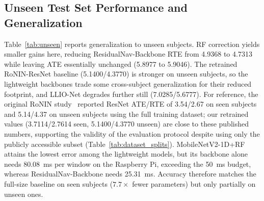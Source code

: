 \documentclass[10pt,conference,letterpaper]{IEEEtran}
\begin{document}
\subsection{Unseen Test Set Performance and Generalization}


Table~\ref{tab:unseen} reports generalization to unseen subjects. RF correction yields smaller gains here, reducing ResidualNav-Backbone RTE from 4.9368 to 4.7313 while leaving ATE essentially unchanged (5.8977 to 5.9046). The retrained RoNIN-ResNet baseline (5.1400/4.3770) is stronger on unseen subjects, so the lightweight backbones trade some cross-subject generalization for their reduced footprint, and LLIO-Net degrades further still (7.0285/5.6777). For reference, the original RoNIN study~\cite{ronin2019} reported ResNet ATE/RTE of 3.54/2.67 on seen subjects and 5.14/4.37 on unseen subjects using the full training dataset; our retrained values (3.7114/2.7614 seen, 5.1400/4.3770 unseen) are close to these published numbers, supporting the validity of the evaluation protocol despite using only the publicly accessible subset (Table~\ref{tab:dataset_splits}). MobileNetV2-1D+RF attains the lowest error among the lightweight models, but its backbone alone needs 80.08~ms per window on the Raspberry Pi, exceeding the 50~ms budget, whereas ResidualNav-Backbone needs 25.31~ms. Accuracy therefore matches the full-size baseline on seen subjects ($7.7\times$ fewer parameters) but only partially on unseen ones.
\end{document}
